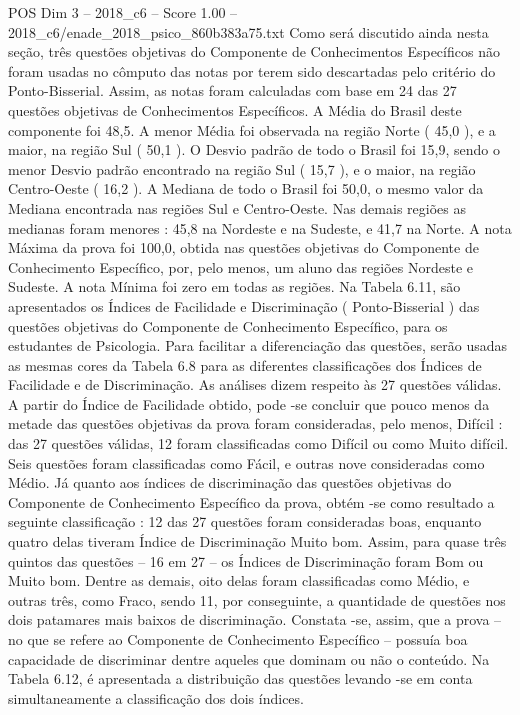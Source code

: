 \begin{textsample}{POS Dim 3 – 2018\_c6 – Score 1.00 – 2018\_c6/enade\_2018\_psico\_860b383a75.txt}
Como será discutido ainda nesta seção, três questões objetivas do Componente de Conhecimentos Específicos não foram usadas no cômputo das notas por terem sido descartadas pelo critério do Ponto-Bisserial.
Assim, as notas foram calculadas com base em 24 das 27 questões objetivas de Conhecimentos Específicos.
A Média do Brasil deste componente foi 48,5.
A menor Média foi observada na região Norte ( 45,0 ), e a maior, na região Sul ( 50,1 ).
O Desvio padrão de todo o Brasil foi 15,9, sendo o menor Desvio padrão encontrado na região Sul ( 15,7 ), e o maior, na região Centro-Oeste ( 16,2 ).
A Mediana de todo o Brasil foi 50,0, o mesmo valor da Mediana encontrada nas regiões Sul e Centro-Oeste.
Nas demais regiões as medianas foram menores : 45,8 na Nordeste e na Sudeste, e 41,7 na Norte.
A nota Máxima da prova foi 100,0, obtida nas questões objetivas do Componente de Conhecimento Específico, por, pelo menos, um aluno das regiões Nordeste e Sudeste.
A nota Mínima foi zero em todas as regiões.
Na Tabela 6.11, são apresentados os Índices de Facilidade e Discriminação ( Ponto-Bisserial ) das questões objetivas do Componente de Conhecimento Específico, para os estudantes de Psicologia.
Para facilitar a diferenciação das questões, serão usadas as mesmas cores da Tabela 6.8 para as diferentes classificações dos Índices de Facilidade e de Discriminação.
As análises dizem respeito às 27 questões válidas.
A partir do Índice de Facilidade obtido, pode -se concluir que pouco menos da metade das questões objetivas da prova foram consideradas, pelo menos, Difícil : das 27 questões válidas, 12 foram classificadas como Difícil ou como Muito difícil.
Seis questões foram classificadas como Fácil, e outras nove consideradas como Médio.
Já quanto aos índices de discriminação das questões objetivas do Componente de Conhecimento Específico da prova, obtém -se como resultado a seguinte classificação : 12 das 27 questões foram consideradas boas, enquanto quatro delas tiveram Índice de Discriminação Muito bom.
Assim, para quase três quintos das questões – 16 em 27 – os Índices de Discriminação foram Bom ou Muito bom.
Dentre as demais, oito delas foram classificadas como Médio, e outras três, como Fraco, sendo 11, por conseguinte, a quantidade de questões nos dois patamares mais baixos de discriminação.
Constata -se, assim, que a prova – no que se refere ao Componente de Conhecimento Específico – possuía boa capacidade de discriminar dentre aqueles que dominam ou não o conteúdo.
Na Tabela 6.12, é apresentada a distribuição das questões levando -se em conta simultaneamente a classificação dos dois índices.

\end{textsample}
